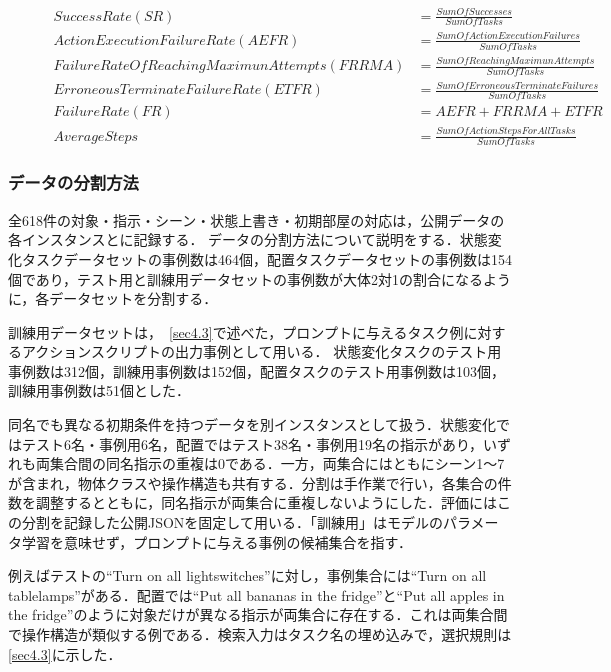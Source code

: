 \begin{figure}[tb]
\footnotesize
\begin{align}
 \label{formula5.1}
 Success Rate(SR) &= \frac{Sum Of Successes}{Sum Of Tasks}\\
 \label{formula5.2}
 Action Execution Failure Rate(AEFR) &= \frac{Sum Of Action Execution Failures}{Sum Of Tasks}\\
 \label{formula5.3}
 Failure Rate Of Reaching Maximun Attempts(FRRMA) &= \frac{Sum Of Reaching Maximun Attempts}{Sum Of Tasks}\\
 \label{formula5.4}
 Erroneous Terminate Failure Rate(ETFR) &= \frac{Sum Of Erroneous Terminate Failures}{Sum Of Tasks}\\
 \label{formula5.5}
 Failure Rate(FR) &= AEFR + FRRMA + ETFR\\
 \label{formula5.6}
 Average Steps &= \frac{Sum Of Action Steps For All Tasks}{Sum Of Tasks}
\end{align}
\end{figure}


\subsubsection{データの分割方法}
全618件の対象・指示・シーン・状態上書き・初期部屋の対応は，公開データの各インスタンスとに記録する．
データの分割方法について説明をする．状態変化タスクデータセットの事例数は464個，配置タスクデータセットの事例数は154個であり，テスト用と訓練用データセットの事例数が大体2対1の割合になるように，各データセットを分割する．

訓練用データセットは，~\ref{sec4.3}で述べた，プロンプトに与えるタスク例に対するアクションスクリプトの出力事例として用いる．
状態変化タスクのテスト用事例数は312個，訓練用事例数は152個，配置タスクのテスト用事例数は103個，訓練用事例数は51個とした．

同名でも異なる初期条件を持つデータを別インスタンスとして扱う．状態変化ではテスト6名・事例用6名，配置ではテスト38名・事例用19名の指示があり，いずれも両集合間の同名指示の重複は0である．一方，両集合にはともにシーン1～7が含まれ，物体クラスや操作構造も共有する．分割は手作業で行い，各集合の件数を調整するとともに，同名指示が両集合に重複しないようにした．評価にはこの分割を記録した公開JSONを固定して用いる．「訓練用」はモデルのパラメータ学習を意味せず，プロンプトに与える事例の候補集合を指す．

例えばテストの``Turn on all lightswitches''に対し，事例集合には``Turn on all tablelamps''がある．配置では``Put all bananas in the fridge''と``Put all apples in the fridge''のように対象だけが異なる指示が両集合に存在する．これは両集合間で操作構造が類似する例である．検索入力はタスク名の埋め込みで，選択規則は\ref{sec4.3}に示した．

